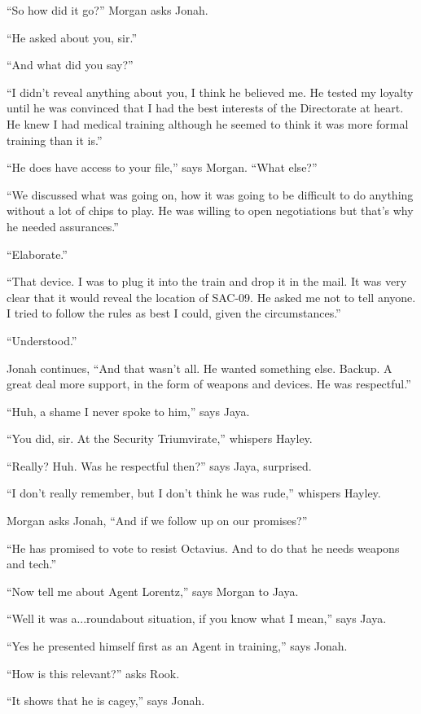 ``So how did it go?'' Morgan asks Jonah.

``He asked about you, sir.''

``And what did you say?''

``I didn't reveal anything about you, I think he believed me.  He tested my loyalty until he was convinced that I had the best interests of the Directorate at heart.  He knew I had medical training although he seemed to think it was more formal training than it is.''

``He does have access to your file,'' says Morgan.  ``What else?''

``We discussed what was going on, how it was going to be difficult to do anything without a lot of chips to play. He was willing to open negotiations but that's why he needed assurances.''

``Elaborate.''

``That device.  I was to plug it into the train and drop it in the mail.  It was very clear that it would reveal the location of SAC-09.  He asked me not to tell anyone.  I tried to follow the rules as best I could, given the circumstances.''

``Understood.''

Jonah continues, ``And that wasn't all.  He wanted something else.  Backup.  A great deal more support, in the form of weapons and devices.  He was respectful.''

``Huh, a shame I never spoke to him,'' says Jaya.

``You did, sir.  At the Security Triumvirate,'' whispers Hayley.

``Really?  Huh.  Was he respectful then?'' says Jaya, surprised.

``I don't really remember, but I don't think he was rude,'' whispers Hayley.

Morgan asks Jonah, ``And if we follow up on our promises?''

``He has promised to vote to resist Octavius.  And to do that he needs weapons and tech.''

``Now tell me about Agent Lorentz,'' says Morgan to Jaya.

``Well it was a...roundabout situation, if you know what I mean,'' says Jaya.

``Yes he presented himself first as an Agent in training,'' says Jonah.

``How is this relevant?'' asks Rook.

``It shows that he is cagey,'' says Jonah.

